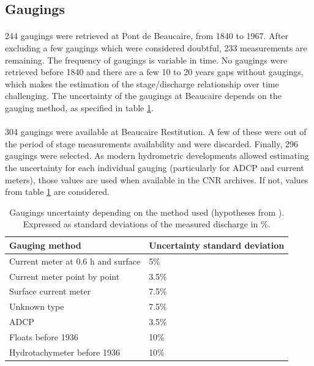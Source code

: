 \documentclass[11pt]{article}
\begin{document}
    \subsection{Gaugings}

    \paragraph{}
    244 gaugings were retrieved at Pont de Beaucaire, from 1840 to 1967. After excluding a few gaugings which were considered doubtful, 233 measurements are remaining. The frequency of gaugings is variable in time. No gaugings were retrieved before 1840 and there are a few 10 to 20 years gaps without gaugings, which makes the estimation of the stage/discharge relationship over time challenging. The uncertainty of the gaugings at Beaucaire depends on the gauging method, as specified in table \ref{TabIcJau}.
    
    \paragraph{}    
    304 gaugings were available at Beaucaire Restitution. A few of these were out of the period of stage measurements availability and were discarded. Finally, 296 gaugings were selected. As modern hydrometric developments allowed estimating the uncertainty for each individual gauging (particularly for ADCP and current meters), those values are used when available in the CNR archives. If not, values from table \ref{TabIcJau} are considered. 
        
         \begin{table}[ht]
            \centering
                \begin{tabular}{| l | l |} 
                        \hline
                        \textbf{Gauging method} & \textbf{Uncertainty standard deviation} \\
                        \hline
                        Current meter at 0.6 h and surface & 5\% \\
                        \hline
                        Current meter point by point & 3.5\% \\
                        \hline
                        Surface current meter & 7.5\% \\
                        \hline
                        Unknown type & 7.5\% \\
                        \hline
                        ADCP & 3.5\% \\
                        \hline
                        Floats before 1936 & 10\% \\
                        \hline
                        Hydrotachymeter before 1936 & 10\%\\
                        \hline
                \end{tabular}
            \caption{Gaugings uncertainty depending on the method used (hypotheses from \citet{bard_actualisation_2018}). Expressed as standard deviations of the measured discharge in \%.}
            \label{TabIcJau}
        \end{table}
 
\end{document}
